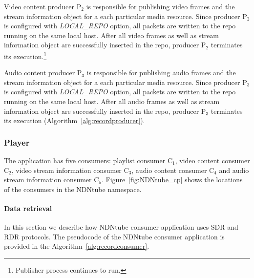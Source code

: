 Video content producer P$_{\text{2}}$ is responsible for publishing video frames and the stream information object for a each particular media resource. Since producer P$_{\text{2}}$ is configured with \textit{LOCAL\_REPO} option, all packets are written to the repo running on the same local host. After all video frames as well as stream information object are successfully inserted in the repo, producer P$_{\text{2}}$ terminates its execution.\footnote{Publisher process continues to run.} 

Audio content producer P$_{\text{3}}$ is responsible for publishing audio frames and the stream information object for a each particular media resource. Since producer P$_{\text{3}}$ is configured with \textit{LOCAL\_REPO} option, all packets are written to the repo running on the same local host. After all audio frames as well as stream information object are successfully inserted in the repo, producer P$_{\text{3}}$ terminates its execution (Algorithm~\ref{alg:recordproducer}).

\subsubsection{Player}

The application has five consumers: playlist consumer C$_{\text{1}}$, video content consumer C$_{\text{2}}$, video stream information consumer C$_{\text{3}}$, audio content consumer C$_{\text{4}}$ and audio stream information consumer C$_{\text{5}}$. Figure~\ref{fig:NDNtube_cp} shows the locations of the consumers in the NDNtube namespace.


\paragraph{Data retrieval} %
\label{par:NDNtube_data_retrieval}
\vspace{0.1cm}

In this section we describe how NDNtube consumer application uses SDR and RDR protocols. The pseudocode of the NDNtube consumer application is provided in the Algorithm~\ref{alg:recordconsumer}.

